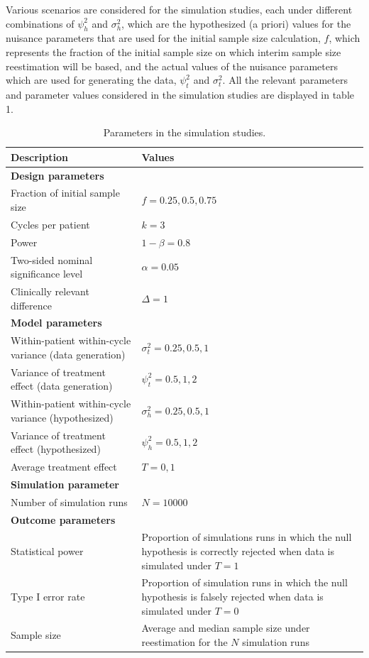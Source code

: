 \documentclass[AMA,STIX1COL,]{WileyNJD-v2}
\begin{document}
Various scenarios are considered for the simulation studies, each under different combinations of \(\psi_h^2\) and \(\sigma_h^2\), which are the hypothesized (a priori) values for the nuisance parameters that are used for the initial sample size calculation, \(f\), which represents the fraction of the initial sample size on which interim sample size reestimation will be based, and the actual values of the nuisance parameters which are used for generating the data, \(\psi_t^2\) and \(\sigma_t^2\). All the relevant parameters and parameter values considered in the simulation studies are displayed in table 1.

\begin{table}[h] 
\begin{center}
\caption{Parameters in the simulation studies.}
\begin{tabular}{p{8cm}p{6cm}} 
\hline
Description & Values \\
\hline 
\textbf{Design parameters} & \\
Fraction of initial sample size & $f = 0.25, 0.5, 0.75$ \\
Cycles per patient & $k = 3$ \\
Power & $1 - \beta = 0.8$ \\
Two-sided nominal significance level & $\alpha = 0.05$ \\
Clinically relevant difference & $\Delta = 1$ \\
\textbf{Model parameters} & \\
Within-patient within-cycle variance (data generation) & $\sigma^2_t = 0.25, 0.5, 1$ \\
Variance of treatment effect (data generation) & $\psi^2_t = 0.5, 1, 2$ \\
Within-patient within-cycle variance (hypothesized) & $\sigma^2_h = 0.25, 0.5, 1$ \\
Variance of treatment effect (hypothesized) & $\psi^2_h = 0.5, 1, 2$ \\
Average treatment effect & $T = 0, 1$  \\
\textbf{Simulation parameter} & \\
Number of simulation runs & $N = 10000$ \\
\hline 
\multicolumn{2}{l}{\textbf{Outcome parameters}} \\
Statistical power & Proportion of simulations runs in which the null hypothesis is correctly rejected when data is simulated under $T = 1$ \\
Type I error rate & Proportion of simulation runs in which the null hypothesis is falsely rejected when data is simulated under $T = 0$ \\
Sample size & Average and median sample size under reestimation for the $N$ simulation runs \\
\hline 
\end{tabular}
\end{center}
\end{table}
\end{document}
